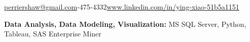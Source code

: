 \documentclass[10pt,a4paper]{article}
\begin{document}
\sloppy  %


\begin{center}
\end{center}

\nobreakvspace{0.2em}  %

\noindent\href{mailto:perriershaw@gmail.com}{perriershaw@gmail.com}-475-4332\sbull\href{https://www.linkedin.com/in/ying-xiao-51b5a1151}{www.linkedin.com/in/ying-xiao-51b5a1151}

\spacedhrule{0em}{-1em}  %
\textbf{Data Analysis, Data Modeling, Visualization:} MS SQL Server, Python, Tableau, SAS Enterprise Miner


\end{document}
